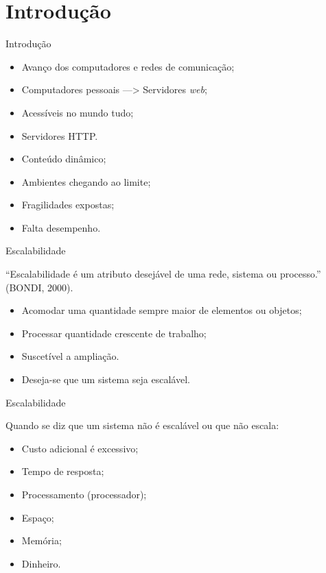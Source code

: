 \section{Introdução}\label{sec:introducao}
\begin{frame}{Introdução}
	\begin{block}{}
		\begin{itemize}
			\item Avanço dos computadores e redes de comunicação;
			\item Computadores pessoais ---> Servidores \textit{web};
			\item Acessíveis no mundo tudo;
			\item Servidores HTTP.
		\end{itemize}
	\end{block} \pause
	\begin{block}{}
		\begin{itemize}
			\item Conteúdo dinâmico;
			\item Ambientes chegando ao limite;
			\item Fragilidades expostas;
			\item Falta desempenho.
		\end{itemize}
	\end{block}
\end{frame}
\begin{frame}{Escalabilidade}
	\begin{block}{}
		``Escalabilidade é um atributo desejável de 
		uma rede, sistema ou processo.'' (BONDI, 2000).
		\begin{itemize}
			\item Acomodar uma quantidade sempre maior de elementos ou objetos;
			\item Processar quantidade crescente de trabalho;
			\item Suscetível a ampliação.
			\item Deseja-se que um sistema seja escalável.
		\end{itemize}
	\end{block}
\end{frame}
\begin{frame}{Escalabilidade}
	\begin{block}{}
		Quando se diz que um sistema não é escalável ou que não escala:
		\begin{itemize}
			\item Custo adicional é excessivo; \pause
			\item Tempo de resposta; \pause
			\item Processamento (processador); \pause
			\item Espaço; \pause
			\item Memória; \pause
			\item Dinheiro.
		\end{itemize}
	\end{block}
\end{frame}
